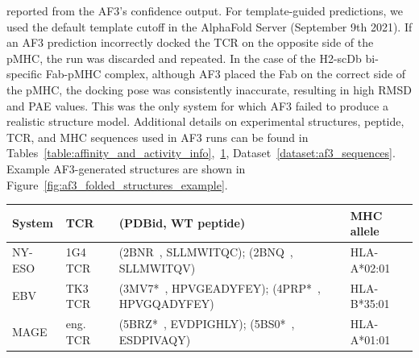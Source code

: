 \begin{table}[ht]
{{reported from the AF3's confidence output. For template-guided predictions, we used the default
template cutoff in the AlphaFold Server (September 9th 2021). If an AF3 prediction incorrectly
docked the TCR on the opposite side of the pMHC, the run was discarded and repeated. In the case of
the H2-scDb bi-specific Fab-pMHC complex, although AF3 placed the Fab on the correct side of the
pMHC, the docking pose was consistently inaccurate, resulting in high RMSD and PAE values. This was
the only system for which AF3 failed to produce a realistic structure model. Additional details on
experimental structures, peptide, TCR, and MHC sequences used in AF3 runs can be found in
Tables~\ref{table:affinity_and_activity_info},~\ref{table:design_info},
Dataset~\ref{dataset:af3_sequences}. Example AF3-generated structures are shown in
Figure~\ref{fig:af3_folded_structures_example}.}}
\label{table:af3_folding_metrics}
\end{table}





\begin{table}
\centering
\begin{tabular}{l l p{} l}
\hline
\textbf{System} & \textbf{TCR} & \textbf{(PDBid, WT peptide)} & \textbf{MHC allele} \\
\hline \hline
NY-ESO & 1G4 TCR & (2BNR~\cite{chen_structural_2005}, SLLMWITQC); (2BNQ~\cite{chen_structural_2005},
SLLMWITQV) & HLA-A*02:01 \\
EBV & TK3 TCR & (3MV7*~\cite{gras_allelic_2010}, HPVGEADYFEY); (4PRP*~\cite{Liu2014-cz},
HPVGQADYFEY) & HLA-B*35:01 \\
MAGE & eng. TCR & (5BRZ*~\cite{Raman2016-ew}, EVDPIGHLY); (5BS0*~\cite{Raman2016-ew}, ESDPIVAQY) &
HLA-A*01:01 \\
\hline
\end{tabular}
\label{table:design_info}
\end{table}



